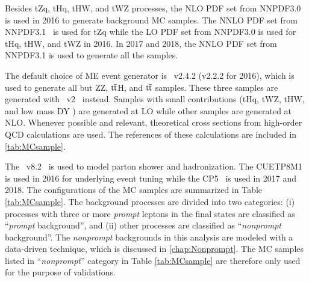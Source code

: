 Besides tZq, tHq, tHW, and tWZ processes, the \ac{NLO} \ac{PDF} set from NNPDF3.0~\cite{NNPDF:2014otw} is used in 2016 to generate background \ac{MC} samples. The \ac{NNLO} \ac{PDF} set from NNPDF3.1~\cite{NNPDF:2017mvq} is used for tZq while the \ac{LO} \ac{PDF} set from NNPDF3.0 is used for tHq, tHW, and tWZ in 2016. In 2017 and 2018, the \ac{NNLO} \ac{PDF} set from NNPDF3.1 is used to generate all the samples. 

The default choice of \ac{ME} event generator is \MG~v2.4.2 (v2.2.2 for 2016), which is used to generate all but ZZ, $\textsf{t}\overline{\textsf{t}}$H, and $\textsf{t}\overline{\textsf{t}}$ samples. These three samples are generated with \Pow~v2~\cite{Frixione:2007vw} instead. Samples with small contributions (tHq, tWZ, tHW, and low mass DY ) are generated at \ac{LO} while other samples are generated at \ac{NLO}. Whenever possible and relevant, theoretical cross sections from high-order \ac{QCD} calculations are used. The references of these calculations are included in \ref{tab:MCsample}.

The \PY~v8.2~\cite{Sjostrand:2014zea} is used to model parton shower and hadronization. The CUETP8M1~\cite{CMS:2015wcf} is used in 2016 for underlying event tuning while the CP5~\cite{CMS:2019csb} is used in 2017 and 2018. The configurations of the \ac{MC} samples are summarized in Table \ref{tab:MCsample}. The background processes are divided into two categories: (i) processes with three or more \emph{prompt} leptons in the final states are classified as ``\emph{prompt} background'', and (ii) other processes are classified as ``\emph{nonprompt} background''. The \emph{nonprompt} backgrounds in this analysis are modeled with a data-driven technique, which is discussed in \autoref{chap:Nonprompt}. The \ac{MC} samples listed in ``\emph{nonprompt}'' category in Table \ref{tab:MCsample} are therefore only used for the purpose of validations. 

